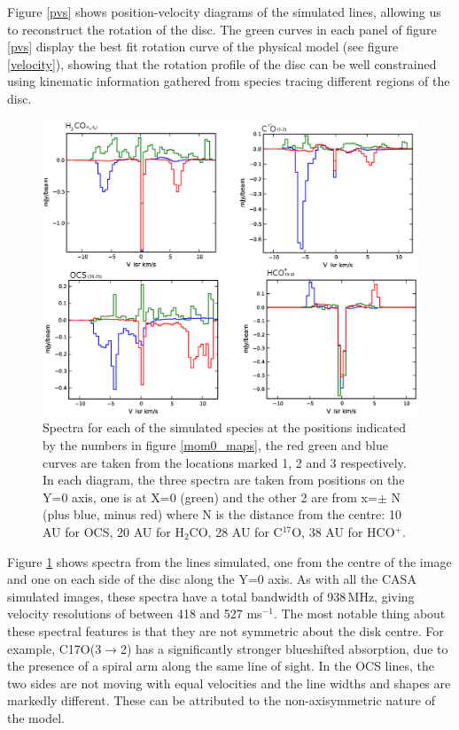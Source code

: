 \documentclass[useAMS,usenatbib]{mn2e}
\begin{document}
Figure \ref{pvs} shows position-velocity diagrams of the simulated lines, allowing us to reconstruct the rotation of the disc. The green curves in each panel of figure \ref{pvs} display the best fit rotation curve of the physical model (see figure \ref{velocity}), showing that the rotation profile of the disc can be well constrained using kinematic information gathered from species tracing different regions of the disc.\newline

\begin{figure}
 \includegraphics[width=168mm]{Figures/sim/casa_all_spectra.eps}
 \caption{Spectra for each of the simulated species at the positions indicated by the numbers in figure \ref{mom0_maps}, the red green and blue curves are taken from the locations marked 1, 2 and 3 respectively. In each diagram, the three spectra are taken from positions on the Y=0 axis, one is at X=0 (green) and the other 2 are from x=$\pm$ N (plus blue, minus red) where N is the distance from the centre: 10 AU for OCS, 20 AU for H$_2$CO, 28 AU for C$^{17}$O, 38 AU for HCO$^+$.}
 \label{spectra}
\end{figure}

Figure \ref{spectra} shows spectra from the lines simulated, one from the centre of the image and one on each side of the disc along the Y=0 axis. As with all the CASA simulated images, these spectra have a total bandwidth of 938$\,$MHz, giving velocity resolutions of between 418 and 527 ms$^{-1}$. The most notable thing about these spectral features is that they are not symmetric about the disk centre. For example, C17O(3$\rightarrow$2) has a significantly stronger blueshifted absorption, due to the presence of a spiral arm along the same line of sight. In the OCS lines, the two sides are not moving with equal velocities and the line widths and shapes are markedly different. These can be attributed to the non-axisymmetric nature of the model.
\end{document}
